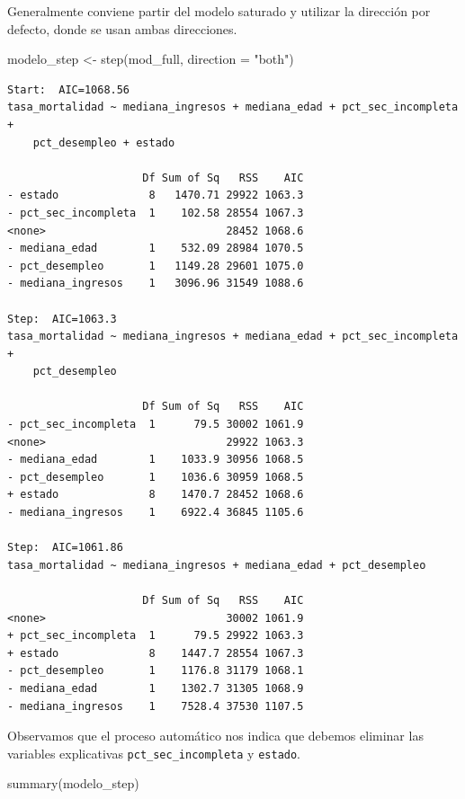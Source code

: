 \documentclass[
  spanish,
  a4paper,
]{scrbook}
\newenvironment{Shaded}{\begin{snugshade}}{\end{snugshade}}
\newcommand{\AttributeTok}[1]{\textcolor[rgb]{0.40,0.45,0.13}{#1}}
\newcommand{\FunctionTok}[1]{\textcolor[rgb]{0.28,0.35,0.67}{#1}}
\newcommand{\NormalTok}[1]{\textcolor[rgb]{0.00,0.23,0.31}{#1}}
\newcommand{\OtherTok}[1]{\textcolor[rgb]{0.00,0.23,0.31}{#1}}
\newcommand{\StringTok}[1]{\textcolor[rgb]{0.13,0.47,0.30}{#1}}
\newcounter{none} %
\begin{document}
Generalmente conviene partir del modelo saturado y utilizar la dirección
por defecto, donde se usan ambas direcciones.

\begin{Shaded}
\begin{Highlighting}[]
\NormalTok{modelo\_step }\OtherTok{\textless{}{-}} \FunctionTok{step}\NormalTok{(mod\_full, }\AttributeTok{direction =} \StringTok{"both"}\NormalTok{)}
\end{Highlighting}
\end{Shaded}

\begin{verbatim}
Start:  AIC=1068.56
tasa_mortalidad ~ mediana_ingresos + mediana_edad + pct_sec_incompleta + 
    pct_desempleo + estado

                     Df Sum of Sq   RSS    AIC
- estado              8   1470.71 29922 1063.3
- pct_sec_incompleta  1    102.58 28554 1067.3
<none>                            28452 1068.6
- mediana_edad        1    532.09 28984 1070.5
- pct_desempleo       1   1149.28 29601 1075.0
- mediana_ingresos    1   3096.96 31549 1088.6

Step:  AIC=1063.3
tasa_mortalidad ~ mediana_ingresos + mediana_edad + pct_sec_incompleta + 
    pct_desempleo

                     Df Sum of Sq   RSS    AIC
- pct_sec_incompleta  1      79.5 30002 1061.9
<none>                            29922 1063.3
- mediana_edad        1    1033.9 30956 1068.5
- pct_desempleo       1    1036.6 30959 1068.5
+ estado              8    1470.7 28452 1068.6
- mediana_ingresos    1    6922.4 36845 1105.6

Step:  AIC=1061.86
tasa_mortalidad ~ mediana_ingresos + mediana_edad + pct_desempleo

                     Df Sum of Sq   RSS    AIC
<none>                            30002 1061.9
+ pct_sec_incompleta  1      79.5 29922 1063.3
+ estado              8    1447.7 28554 1067.3
- pct_desempleo       1    1176.8 31179 1068.1
- mediana_edad        1    1302.7 31305 1068.9
- mediana_ingresos    1    7528.4 37530 1107.5
\end{verbatim}

Observamos que el proceso automático nos indica que debemos eliminar las
variables explicativas \texttt{pct\_sec\_incompleta} y \texttt{estado}.

\begin{Shaded}
\begin{Highlighting}[]
\FunctionTok{summary}\NormalTok{(modelo\_step)}
\end{Highlighting}
\end{Shaded}
\end{document}
